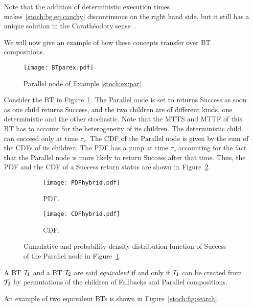 \begin{remark}
Note that the addition of deterministic execution times makes~\eqref{stoch:bg.eq.cauchy} discontinuous on the right hand side, but it still has a unique solution in the Carath\'eodory sense~\cite{filippov1988differential}.
\end{remark}

We will now give an example of how these concepts transfer over BT compositions.

\begin{figure}[h]
\centering
\texttt{[image: BTparex.pdf]}
\caption{Parallel node of Example \ref{stoch:ex:par}.}
\label{stoch:DE.fig.parexbt}
\end{figure}

\begin{example}
\label{stoch:ex:par}
Consider the BT in Figure~\ref{stoch:DE.fig.parexbt}. The Parallel node is set to returns Success as soon as one child returns Success, and the two children are of different kinds,
one deterministic and the other stochastic.
Note that the MTTS and MTTF of this BT has to account for the heterogeneity of its children. 
The deterministic child can succeed only at time $\tau_s$. The CDF of the Parallel node is given by the sum of the CDFs of its children. The PDF has a jump at time $\tau_s$ accounting for the fact that the Parallel node is more likely to return Success after that time.
Thus, the PDF and the CDF of a Success return status are shown in Figure~\ref{stoch:DE.fig.parexpd}. 

\begin{figure}[h]
\centering
\begin{subfigure}[h]{0.8\columnwidth}
\texttt{[image: PDFhybrid.pdf]}
\caption{PDF.}
\end{subfigure}
\begin{subfigure}[h]{0.8\columnwidth}
\texttt{[image: CDFhybrid.pdf]}
\caption{CDF.}
\end{subfigure}
\caption{Cumulative and probability density distribution function of Success of the Parallel node in Figure~\ref{stoch:DE.fig.parexbt}.}
\label{stoch:DE.fig.parexpd}
\end{figure}
\end{example}


\begin{definition}
A BT $\mathcal{T}_1$ and a BT $\mathcal{T}_2$ are said \emph{equivalent} if and only if 
$\mathcal{T}_1$ can be created from $\mathcal{T}_2$ by permutations of the children of Fallbacks and Parallel compositions.
\label{stoch:PS.def.eq}
\end{definition}
An example of two equivalent BTs is shown in Figure~\ref{stoch:fig:search}.

